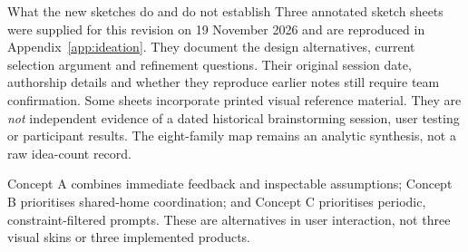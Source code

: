 \documentclass[12pt,a4paper]{article}
\begin{document}
\begin{cautionbox}{What the new sketches do and do not establish}
Three annotated sketch sheets were supplied for this revision on 19 November 2026 and are reproduced in Appendix~\ref{app:ideation}. They document the design alternatives, current selection argument and refinement questions. Their original session date, authorship details and whether they reproduce earlier notes still require team confirmation. Some sheets incorporate printed visual reference material. They are \emph{not} independent evidence of a dated historical brainstorming session, user testing or participant results. The eight-family map remains an analytic synthesis, not a raw idea-count record.
\end{cautionbox}

Concept A combines immediate feedback and inspectable assumptions; Concept B prioritises shared-home coordination; and Concept C prioritises periodic, constraint-filtered prompts. These are alternatives in user interaction, not three visual skins or three implemented products.
\end{document}
